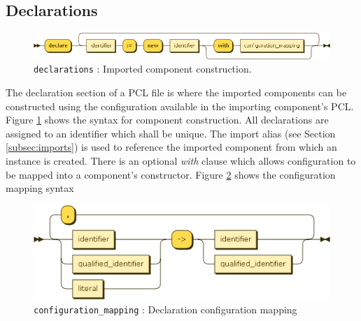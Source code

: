 \subsection{Declarations}
\begin{figure}[h!]
  \centering
    \includegraphics[scale=0.45]{chapters/compiler/diagrams/declarations}
  \caption{\texttt{declarations} : Imported component construction.}
  \label{fig:pcl-decls}
\end{figure}
The declaration section of a PCL file is where the imported components can be constructed using the configuration available in the importing component's PCL. Figure \ref{fig:pcl-decls} shows the syntax for component construction. All declarations are assigned to an identifier which shall be unique. The import alias (see Section \ref{subsec:imports}) is used to reference the imported component from which an instance is created. There is an optional \emph{with} clause which allows configuration to be mapped into a component's constructor. Figure \ref{fig:pcl-config-mapping} shows the configuration mapping syntax
\begin{figure}[h!]
  \centering
    \includegraphics[scale=\DiagramScale]{chapters/compiler/diagrams/configuration_mapping}
  \caption{\texttt{configuration\_mapping} : Declaration configuration mapping}
  \label{fig:pcl-config-mapping}
\end{figure}


